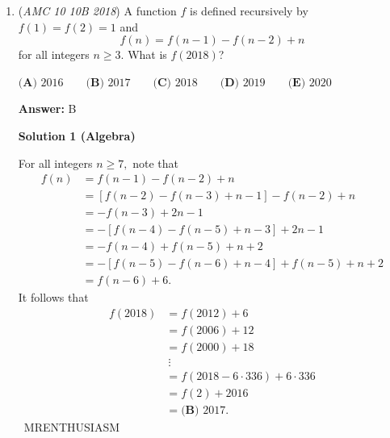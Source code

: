 \begin{enumerate}
 



\textbf{Solution 6 (Number Theory + Logic)}

Let Joey's age be $J$, Chloe's age be $C$, and $C-1=K$. This gives $C=1+K$ and $J=2+K$. After $t$ years, Zoe will be $t+1$ years old and Chloe will be $C+t$ years old. Chloe's age is an integral multiple of Zoe's age when $1+t|C+t$. By the Divisibility of Differences rule (which is a unique case of the linear combination property of divisibility), $t+1|C+t-(t+1)$->$t+1|C-1$->$t+1=K$.

 $K$ must have exactly $9$ positive integer factors, since there are precisely $9$ values of $t$ for which Zoe's age is a factor of Chloe's age. The smallest number with this property is $2^2 \times 3^2=36$. We assume this is the value of $K$, as the next smallest value of $K$ (which is $K=100$) yields the unlikely case that Chloe is currently $101$ years old. 

 Since $K=36$, we have $C=1+36=37$ and $J=2+36=38$. Joey's age is a multiple of Zoe's age when $Z+t|J+t$. Plugging in the values of $Z$ and $J$, we get $t+1|t+38$. By the Divisibility of Differences rule, $t+1|t+38-(t+1)=37$. The smallest value of $t$ is $36$, so Joey will be $38+36=74$ years old. The sum of the digits is $7+4=\boxed{\textbf{(E) } 11}$.

 


	\item (\textit{AMC 10 10B 2018}) A function $f$ is defined recursively by $f(1)=f(2)=1$ and 
 \[f(n)=f(n-1)-f(n-2)+n\]for all integers $n \geq 3$. What is $f(2018)$?


 $\textbf{(A) } 2016 \qquad \textbf{(B) } 2017 \qquad \textbf{(C) } 2018 \qquad \textbf{(D) } 2019 \qquad \textbf{(E) } 2020$

 \textbf{Answer: }B



\textbf{Solution 1 (Algebra)}

For all integers $n \geq 7,$ note that
 \begin{align*} f(n)&=f(n-1)-f(n-2)+n \\ &=[f(n-2)-f(n-3)+n-1]-f(n-2)+n \\ &=-f(n-3)+2n-1 \\ &=-[f(n-4)-f(n-5)+n-3]+2n-1 \\ &=-f(n-4)+f(n-5)+n+2 \\ &=-[f(n-5)-f(n-6)+n-4]+f(n-5)+n+2 \\ &=f(n-6)+6. \end{align*}
It follows that
 \begin{align*} f(2018)&=f(2012)+6 \\ &=f(2006)+12 \\ &=f(2000)+18 \\ & \ \vdots \\ &=f(2018-6\cdot336)+6\cdot336 \\ &=f(2)+2016 \\ &=\boxed{\textbf{(B) } 2017}. \end{align*}
~MRENTHUSIASM


\end{enumerate}
